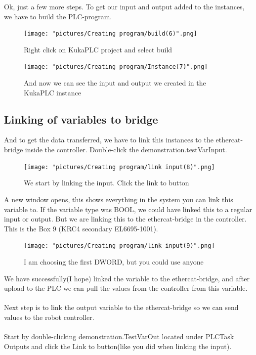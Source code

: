 \documentclass{article}
\begin{document}
\newpage

Ok, just a few more steps. To get our input and output added to the instances, we have to build the PLC-program. 

\begin{figure}[!h]
    \centering
    \texttt{[image: "pictures/Creating program/build(6)".png]}
    \caption{Right click on KukaPLC project and select build}
    \label{fig:my_label}
\end{figure}



\begin{figure}[!h]
    \centering
    \texttt{[image: "pictures/Creating program/Instance(7)".png]}
    \caption{And now we can see the input and output we created in the KukaPLC instance}
    \label{fig:my_label}
\end{figure}

\newpage

\subsection{Linking of variables to bridge}

And to get the data transferred, we have to link this instances to the ethercat-bridge inside the controller. Double-click the demonstration.testVarInput.


\begin{figure}[!h]
    \centering
    \texttt{[image: "pictures/Creating program/link input(8)".png]}
    \caption{We start by linking the input. Click the link to button}
    \label{fig:my_label}
\end{figure}

A new window opens, this shows everything in the system you can link this variable to. If the variable type was BOOL, we could have linked this to a regular input or output. But we are linking this to the ethercat-bridge in the controller. This is the Box 9 (KRC4 secondary EL6695-1001). 

\begin{figure}[!h]
    \centering
    \texttt{[image: "pictures/Creating program/link input(9)".png]}
    \caption{I am choosing the first DWORD, but you could use anyone }
    \label{fig:my_label}
\end{figure}

\newpage

We have successfully(I hope) linked the variable to the ethercat-bridge, and after upload to the PLC we can pull the values from the controller from this variable.
\\\\
Next step is to link the output variable to the ethercat-bridge so we can send values to the robot controller. 
\\\\
Start by double-clicking demonstration.TestVarOut located under PLCTask Outputs and click the Link to button(like you did when linking the input).
\\\\
\end{document}
